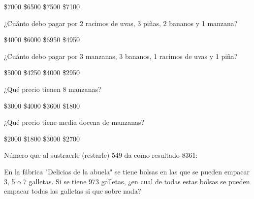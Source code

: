 \documentclass[10pt,letterpaper,addpoints]{exam}
\begin{document}
\begin{questions}
\begin{oneparchoices}
\choice \$7000
\choice \$6500
\choice \$7500
\CorrectChoice \$7100
\end{oneparchoices}
\question ¿Cuánto debo pagar por 2 racimos de uvas, 3 piñas, 2 bananos y 1 manzana?

\begin{oneparchoices}
\choice \$4000
\choice \$6000
\CorrectChoice \$6950
\choice \$4950
\end{oneparchoices}
\question
¿Cuánto debo pagar por 3 manzanas, 3 bananos, 1 racimos de uvas y 1 piña?

\begin{oneparchoices}
\choice \$5000
\CorrectChoice \$4250
\choice \$4000
\choice \$2950
\end{oneparchoices}
\question ¿Qué precio tienen 8 manzanas?

\begin{oneparchoices}
\choice \$3000
\choice \$4000
\CorrectChoice \$3600
\choice \$1800
\end{oneparchoices}
\question \label{quest20}
¿Qu\'e precio tiene media docena de manzanas?

\begin{oneparchoices}
\choice \$2000
\choice \$1800
\choice \$3000
\CorrectChoice \$2700
\end{oneparchoices}
\question
Número que al sustraerle (restarle) 549 da como resultado 8361:

\begin{oneparchoices}
\end{oneparchoices}
\question
En la fábrica "Delicias de la abuela" se tiene bolsas en las que se pueden empacar 3, 5 o 7 galletas. Si se tiene 973 galletas, ¿en cual de todas estas bolsas se pueden empacar todas las galletas si que sobre nada?

\begin{oneparchoices}
\end{oneparchoices}
\end{questions}
\end{document}
